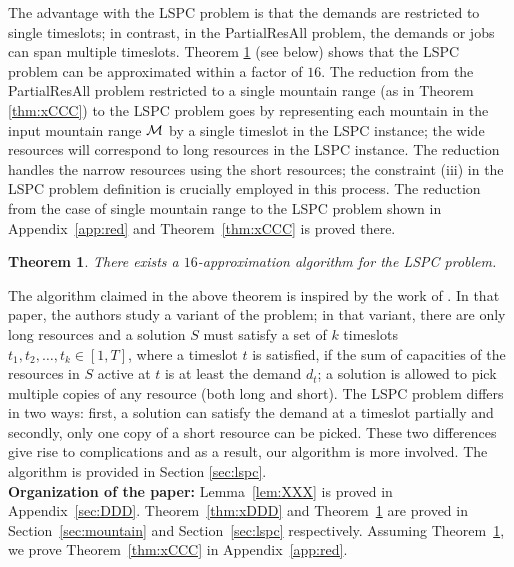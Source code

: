 \documentclass[11pt]{article}
\newtheorem{theorem}{Theorem}
\newcommand{\PResAll}{{\sc PartialResAll}}
\newcommand{\lspc}{{\sc LSPC}}
\newcommand{\calM} {{\cal M}}
\begin{document}
\begin{figure*}[t]
\begin{center}
\end{center}
\caption{The {\lspc} problem}
\label{fig:dd}
\end{figure*}

The advantage with the {\lspc} problem is that the demands are restricted to single timeslots; in contrast,
in the {\PResAll} problem, the demands or jobs can span multiple timeslots.
Theorem \ref{thm:xEEE} (see below) shows that the {\lspc} problem can be approximated within a factor of $16$.
The reduction from the {\PResAll} problem restricted to a single mountain range 
(as in Theorem \ref{thm:xCCC}) to the {\lspc} problem goes by representing each mountain in the input mountain
range $\calM$ by a single timeslot in the {\lspc} instance; 
the wide resources will correspond to long resources in the {\lspc} instance.
The reduction handles the narrow resources using the short resources; the
constraint (iii) in the {\lspc} problem definition is crucially employed in this process.
The reduction from the case of single mountain range to the {\lspc} problem 
shown in Appendix~\ref{app:red} and Theorem~\ref{thm:xCCC} is proved there.





\begin{theorem}
\label{thm:xEEE}
There exists a $16$-approximation algorithm for the {\lspc} problem.
\end{theorem}

The algorithm claimed in the above theorem is inspired by the work of \cite{esa2011}. In that paper, the authors
study a variant of the problem; in that variant,
there are only long resources and a solution $S$ must satisfy a set of $k$
timeslots $t_1,t_2,\ldots, t_k\in [1,T]$, where a timeslot $t$
is satisfied, if the sum of capacities of the resources in $S$ active at $t$
is at least the demand $d_t$; a solution is allowed to pick multiple copies of any resource (both long and short). 
The {\lspc} problem differs in two ways: first, a solution can satisfy the demand at a timeslot partially
and secondly, only one copy of a short resource can be picked.
These two differences give rise to complications and as a result, our algorithm is more involved.
The algorithm is provided in Section \ref{sec:lspc}.\\

\noindent
{\bf Organization of the paper:}
Lemma~\ref{lem:XXX} is proved in Appendix~\ref{sec:DDD}.
Theorem~\ref{thm:xDDD} and Theorem~\ref{thm:xEEE} are
proved in Section~\ref{sec:mountain} and Section~\ref{sec:lspc} respectively.
Assuming Theorem~\ref{thm:xEEE}, we prove Theorem~\ref{thm:xCCC} 
in Appendix~\ref{app:red}. 
\end{document}
